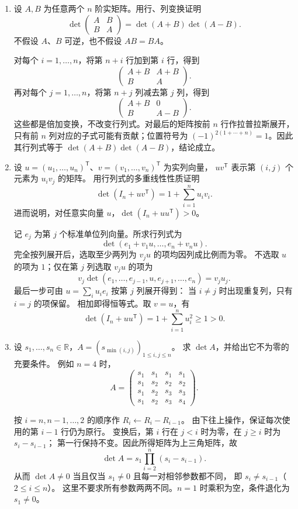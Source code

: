 \documentclass[UTF8,12pt,a4paper,fontset=fandol]{ctexart}
\begin{document}
\begin{enumerate}[label=\arabic*.,resume=detquestions]
\item\label{q:block-determinant}
设 $A,B$ 为任意两个 $n$ 阶实矩阵。用行、列变换证明
\[
\det\begin{pmatrix}A&B\\B&A\end{pmatrix}
=\det(A+B)\det(A-B).
\]
不假设 $A$、$B$ 可逆，也不假设 $AB=BA$。
\begin{solve}
对每个 $i=1,\ldots,n$，将第 $n+i$ 行加到第 $i$ 行，得到
\[
\begin{pmatrix}A+B&A+B\\B&A\end{pmatrix}.
\]
再对每个 $j=1,\ldots,n$，将第 $n+j$ 列减去第 $j$ 列，得到
\[
\begin{pmatrix}A+B&0\\B&A-B\end{pmatrix}.
\]
这些都是倍加变换，不改变行列式。对最后的矩阵按前 $n$ 行作拉普拉斯展开，
只有前 $n$ 列对应的子式可能有贡献；位置符号为
$(-1)^{2(1+\cdots+n)}=1$。因此其行列式等于
$\det(A+B)\det(A-B)$，结论成立。
\end{solve}

\item\label{q:rank-one}
设 $u=(u_1,\ldots,u_n)^{\mathsf T}$、$v=(v_1,\ldots,v_n)^{\mathsf T}$ 为实列向量，
$uv^{\mathsf T}$ 表示第 $(i,j)$ 个元素为 $u_iv_j$ 的矩阵。
用行列式的多重线性性质证明
\[
\det(I_n+uv^{\mathsf T})=1+\sum_{i=1}^n u_iv_i.
\]
进而说明，对任意实向量 $u$，$\det(I_n+uu^{\mathsf T})>0$。
\begin{solve}
记 $e_j$ 为第 $j$ 个标准单位列向量。所求行列式为
\[
\det(e_1+v_1u,\ldots,e_n+v_nu).
\]
完全按列展开后，选取至少两列为 $v_ju$ 的项均因列成比例而为零。
不选取 $u$ 的项为 $1$；仅在第 $j$ 列选取 $v_ju$ 的项为
\[
v_j\det(e_1,\ldots,e_{j-1},u,e_{j+1},\ldots,e_n)=v_ju_j.
\]
最后一步可由 $u=\sum_i u_i e_i$ 按第 $j$ 列展开得到：
当 $i\ne j$ 时出现重复列，只有 $i=j$ 的项保留。
相加即得恒等式。取 $v=u$，有
\[
\det(I_n+uu^{\mathsf T})=1+\sum_{i=1}^n u_i^2\geq1>0.
\]
\end{solve}

\item\label{q:min-index}
设 $s_1,\ldots,s_n\in\mathbb R$，$A=(s_{\min(i,j)})_{1\leq i,j\leq n}$。
求 $\det A$，并给出它不为零的充要条件。
例如 $n=4$ 时，
\[
A=\begin{pmatrix}
s_1&s_1&s_1&s_1\\
s_1&s_2&s_2&s_2\\
s_1&s_2&s_3&s_3\\
s_1&s_2&s_3&s_4
\end{pmatrix}.
\]
\begin{solve}
按 $i=n,n-1,\ldots,2$ 的顺序作 $R_i\leftarrow R_i-R_{i-1}$。
由下往上操作，保证每次使用的第 $i-1$ 行仍为原行。
变换后，第 $i$ 行在 $j<i$ 时为零，在 $j\geq i$ 时为 $s_i-s_{i-1}$；
第一行保持不变。因此所得矩阵为上三角矩阵，故
\[
\boxed{\det A=s_1\prod_{i=2}^n(s_i-s_{i-1}).}
\]
从而 $\det A\ne0$ 当且仅当 $s_1\ne0$ 且每一对相邻参数都不同，
即 $s_i\ne s_{i-1}$（$2\leq i\leq n$）。
这里不要求所有参数两两不同。$n=1$ 时乘积为空，条件退化为 $s_1\ne0$。
\end{solve}


\end{enumerate}
\end{document}
